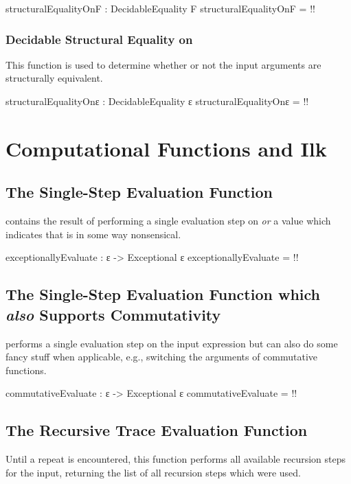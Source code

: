 \documentclass{report}
\begin{document}
\begin{code}
structuralEqualityOnF : DecidableEquality F
structuralEqualityOnF = {!!}
\end{code}

\subsection{Decidable Structural Equality on }
This function is used to determine whether or not the input arguments are structurally equivalent.

\begin{code}
structuralEqualityOnε : DecidableEquality ε
structuralEqualityOnε = {!!}
\end{code}

\chapter{Computational Functions and Ilk}

\section{The Single-Step Evaluation Function}
  contains the result of performing a single evaluation step on  \emph{or} a value which indicates that  is in some way nonsensical.

\begin{code}
exceptionallyEvaluate : ε -> Exceptional ε
exceptionallyEvaluate = {!!}
\end{code}

\section{The Single-Step Evaluation Function which \emph{also} Supports Commutativity}
  performs a single evaluation step on the input expression but can also do some fancy stuff when applicable, e.g., switching the arguments of commutative functions.

\begin{code}
commutativeEvaluate : ε -> Exceptional ε
commutativeEvaluate = {!!}
\end{code}

\section{The Recursive Trace Evaluation Function}
Until a repeat is encountered, this function performs all available recursion steps for the input, returning the list of all recursion steps which were used.
\end{document}
